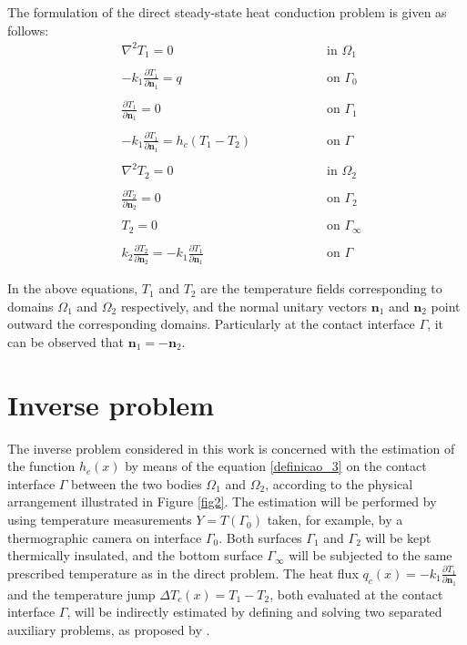\documentclass[12pt]{CHT-20}
\begin{document}
The formulation of the direct steady-state heat conduction problem is given as follows:
\begin{subequations}
	\begin{alignat}{2}
	& \nabla^2 T_1 = 0 \quad\quad\quad\quad && \text{ in } \Omega_1 \label{harm_T1} \\ \nonumber \\
	& -k_1 \frac{\partial T_1}{\partial\mathbf{n}_1} = q && \text{ on } \Gamma_0  \label{cc_T1_2} \\  \nonumber \\
	& \frac{\partial T_1}{\partial \mathbf{n}_1} = 0 && \text{ on }  \Gamma_1 \label{cc_T1_1} \\  \nonumber \\
	& -k_1 \frac{\partial T_1}{\partial\mathbf{n}_1} = h_c(T_1-T_2) \quad\quad\quad\quad && \text{ on }  \Gamma \label{cc_grad_T1} \\  \nonumber \\
	& \nabla^2 T_2 = 0 && \text{ in }  \Omega_2 \label{harm_T2} \\  \nonumber \\
	& \frac{\partial T_2}{\partial \mathbf{n}_2} = 0 && \text{ on }  \Gamma_2 \label{cc_T1_3} \\ \nonumber \\
	& T_2 = 0 && \text{ on }  \Gamma_\infty \label{cc_T1_4} \\  \nonumber \\
	& k_2\frac{\partial T_2}{\partial\mathbf{n}_2} = - k_1\frac{\partial T_1}{\partial\mathbf{n}_1} && \text{ on }  \Gamma \label{cc_T1_5}
	\end{alignat}
\end{subequations}

In the above equations, $T_1$ and $T_2$ are the temperature fields corresponding to domains $\Omega_1$ and $\Omega_2$ respectively, and the normal unitary vectors $\mathbf{n}_1$ and $\mathbf{n}_2$ point outward the corresponding domains. Particularly at the contact interface $\Gamma$, it can be observed that $\mathbf{n}_1 = -\mathbf{n}_2$.

\section*{Inverse problem}

The inverse problem considered in this work is concerned with the estimation of the function $h_c(x)$ by means of the equation \eqref{definicao_3} on the contact interface $\Gamma$ between the two bodies $\Omega_1$ and $\Omega_2$, according to the physical arrangement illustrated in Figure \ref{fig2}. The estimation will be performed by using temperature measurements $Y = T(\Gamma_0)$ taken, for example, by a thermographic camera on interface $\Gamma_0$. Both surfaces $\Gamma_1$ and $\Gamma_2$ will be kept thermically insulated, and the bottom surface $\Gamma_\infty$ will be subjected to the same prescribed temperature as in the direct problem. The heat flux $q_c(x) = -k_1\frac{\partial T_1}{\partial \mathbf{n}_1}$ and the temperature jump $\Delta T_c(x) = T_1 - T_2$, both evaluated at the contact interface $\Gamma$, will be indirectly estimated by defining and solving two separated auxiliary problems, as proposed by \cite{reciproc_3}.
\end{document}
